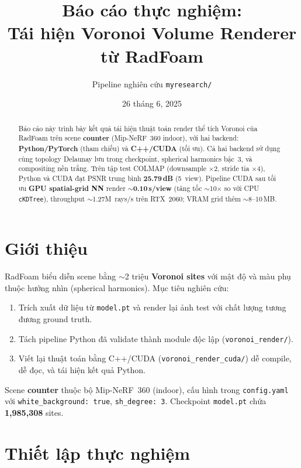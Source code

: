 \documentclass[11pt,a4paper]{article}
\title{Báo cáo thực nghiệm:\\Tái hiện Voronoi Volume Renderer từ RadFoam}
\author{Pipeline nghiên cứu \texttt{myresearch/}}
\date{26 tháng 6, 2025}
\begin{document}
\maketitle

\begin{abstract}
Báo cáo này trình bày kết quả tái hiện thuật toán render thể tích Voronoi của RadFoam trên scene \textbf{counter} (Mip-NeRF~360 indoor), với hai backend: \textbf{Python/PyTorch} (tham chiếu) và \textbf{C++/CUDA} (tối ưu). Cả hai backend sử dụng cùng topology Delaunay lưu trong checkpoint, spherical harmonics bậc~3, và compositing nền trắng. Trên tập test COLMAP (downsample $\times$2, stride tia $\times$4), Python và CUDA đạt PSNR trung bình \textbf{25.79\,dB} (5~view). Pipeline CUDA sau tối ưu \textbf{GPU spatial-grid NN} render \textbf{$\sim$0.10\,s/view} (tăng tốc $\sim$10$\times$ so với CPU \texttt{cKDTree}), throughput $\sim$1.27M~rays/s trên RTX~2060; VRAM grid thêm $\sim$8--10\,MB.
\end{abstract}

\tableofcontents
\newpage

\section{Giới thiệu}

RadFoam biểu diễn scene bằng $\sim$2 triệu \textbf{Voronoi sites} với mật độ và màu phụ thuộc hướng nhìn (spherical harmonics). Mục tiêu nghiên cứu:
\begin{enumerate}[noitemsep]
    \item Trích xuất dữ liệu từ \texttt{model.pt} và render lại ảnh test với chất lượng tương đương ground truth.
    \item Tách pipeline Python đã validate thành module độc lập (\texttt{voronoi\_render/}).
    \item Viết lại thuật toán bằng C++/CUDA (\texttt{voronoi\_render\_cuda/}) dễ compile, dễ đọc, và tái hiện kết quả Python.
\end{enumerate}

Scene \textbf{counter} thuộc bộ Mip-NeRF~360 (indoor), cấu hình trong \texttt{config.yaml} với \texttt{white\_background: true}, \texttt{sh\_degree: 3}. Checkpoint \texttt{model.pt} chứa \textbf{1,985,308} sites.

\section{Thiết lập thực nghiệm}
\end{document}
